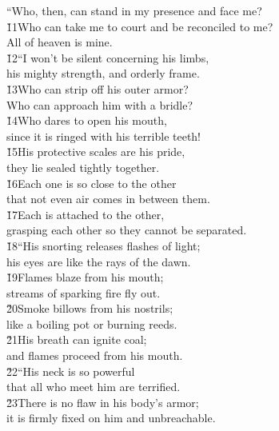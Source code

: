 \begin{poetry}
\poeml ``Who, then, can stand in my presence and face me? \\
\poeml \v{11}Who can take me to court and be reconciled to me? \\
\poemlll       All of heaven is mine. \\
\poeml \v{12}``I won't be silent concerning his limbs, \\
\poemll    his mighty strength, and orderly frame. \\
\poeml \v{13}Who can strip off his outer armor? \\
\poemll    Who can approach him with a bridle? \\
\poeml \v{14}Who dares to open his mouth, \\
\poemll    since it is ringed with his terrible teeth! \\
\poeml \v{15}His protective scales are his pride, \\
\poemll    they lie sealed tightly together. \\
\poeml \v{16}Each one is so close to the other \\
\poemll    that not even air comes in between them. \\
\poeml \v{17}Each is attached to the other, \\
\poemll    grasping each other so they cannot be separated. \\
\poeml \v{18}``His snorting releases flashes of light; \\
\poemll    his eyes are like the rays of the dawn. \\
\poeml \v{19}Flames blaze from his mouth; \\
\poemll    streams of sparking fire fly out. \\
\poeml \v{20}Smoke billows from his nostrils; \\
\poemll    like a boiling pot or burning reeds. \\
\poeml \v{21}His breath can ignite coal; \\
\poemll    and flames proceed from his mouth. \\
\poeml \v{22}``His neck is so powerful \\
\poemll    that all who meet him are terrified. \\
\poeml \v{23}There is no flaw in his body's armor; \\
\poemll    it is firmly fixed on him and unbreachable. \\

\end{poetry}
